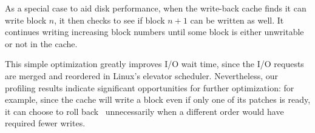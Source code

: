 As a special case to aid disk performance, when the write-back cache finds
it can write block $n$, it then checks to see if block $n+1$ can be written as
well.
%
It continues writing increasing block numbers until some block is either
unwritable or not in the cache.
%
\begin{comment}
The block itself is also marked \PInfst, so that only
one version of its data will be in flight at a time. (This whole procedure is
basically the buffer cache \textit{Write block} action.)
\end{comment}
%
This simple optimization greatly improves I/O wait time, since the I/O
requests are merged and reordered in Linux's elevator scheduler.
%
Nevertheless, our profiling results indicate significant opportunities for
further optimization: for example, since the cache will write a block even
if only one of its patches is ready, it can choose to roll back
\patches\ unnecessarily when a different order would have required fewer
writes.


\begin{comment}
Each \chdesc\ on a cached block may or may not be visible to a given \module.
For example, \modules\ that respond to user requests generally view the most
current state of every block -- the block with all \chdescs\ applied. However, a
write-back cache may choose to write some \chdescs\ on a block while reverting
others, since those others currently have outstanding dependencies. In this
case, \modules\ below the write-back cache (i.e. closer to the disk) should view
those \chdescs\ in the reverted state. \Kudos\ provides a block revisioning
library function that automatically rolls back those \chdescs\ that should not
be visible at a particular \module, and then rolls them forward again after that
\module\ is done with the block.
\end{comment}

